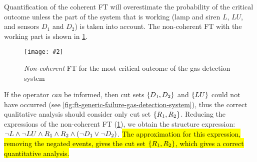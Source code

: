 \documentclass[12pt,openright,twoside,a4paper,oldfontcommands,english,brazil,draft]{abntex2}
\theoremstyle{theo}
\newcommand{\includegraphicsaspectratio}[2][1]{%
  \texttt{[image: \#2]}%
}
\newcommand{\setsin}[1]{\ensuremath\left\{ #1 \right\}}
\newcommand{\parsin}[1]{\ensuremath\left( #1 \right)}
\begin{document}
Quantification of the coherent \ac{FT} will overestimate the probability of the critical outcome unless the part of the system that is working (lamp and siren $L$, $LU$, and sensors $D_1$ and $D_2$) is taken into account.
The non-coherent \ac{FT} with the working part is shown in \cref{fig:outcome-4-non-coherent-ft}.

\begin{figure}[t]
  \centering
  \includegraphicsaspectratio[0.65]{outcome-4-non-coherent-ft}
  \caption{\emph{Non-coherent} \ac{FT} for the most critical outcome of the gas detection system}
  \label{fig:outcome-4-non-coherent-ft}
\end{figure}

If the operator \emph{can} be informed, then cut sets $\setsin{D_1, D_2}$ and $\setsin{LU}$ could not have occurred (see \cref{fig:ft-generic-failure-gas-detection-system}), thus the correct qualitative analysis should consider only cut set $\setsin{R_1,R_2}$.
Reducing the expressions of the non-coherent \ac{FT} (\cref{fig:outcome-4-non-coherent-ft}), we obtain the structure expression: $\lnot L \land \lnot LU \land R_1 \land R_2 \land \parsin{\lnot D_1 \lor \lnot D_2}$.
\hl{The approximation for this expression, removing the negated events, gives the cut set $\setsin{R_1,R_2}$, which gives a correct quantitative analysis.} 



\end{document}
